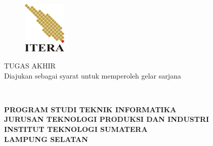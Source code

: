 \clearpage
\pagestyle{empty}
% 

\begin{center}
\smallskip

    \begin{figure}[h]
    	\centering
    	\includegraphics[width=2.1cm, height=2.5cm, keepaspectratio]{figures/itera-logo}
    \end{figure}

	\large \bfseries \MakeUppercase{\thetitle}
	\vfill

    \large \uppercase{Tugas Akhir}\\
    {\normalsize \normalfont Diajukan sebagai syarat untuk memperoleh gelar sarjana}
    \vfill

    \normalsize \normalfont \theauthor\\
    \printnim
    \vfill

    \normalsize \bfseries
    \uppercase{
        Program Studi Teknik Informatika \\
        Jurusan Teknologi Produksi dan Industri\\
        Institut Teknologi Sumatera\\
        Lampung Selatan
    }\medskip

    \the\year{}

\end{center}

\clearpage
